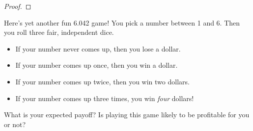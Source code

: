 \documentclass[12pt]{article}
\begin{document}
{\begin{proof}
\end{proof}

\iffalse

\begin{proof} %
\begin{align*}
\ex{R}
  & = \sum_{w \in S} R(w) \cdot \pr{w} & \text{def. of expectation}\\
  & = \sum_{w \in S} R(w) \cdot \paren{\sum_{k=1}^n \pr{w \mid E_k}
  \cdot \pr{E_k}} & \text{Total Probability} \\ & = \sum_{w \in S}
  \sum_{k=1}^n R(w) \cdot \pr{w \mid E_k} \cdot \pr{E_k} & \text{pull
  $R(w)$ into inner sum} \\ & = \sum_{k=1}^n \sum_{w \in S} R(w) \cdot
  \pr{w \mid E_k} \cdot \pr{E_k} & \text{swap sums} \\ & =
  \sum_{k=1}^n \pr{E_k} \cdot \paren{\sum_{w \in S} R(w) \cdot \pr{w
  \mid E_k}} & \text{pull $\pr{E_k}$ out} \\ & = \sum_{k=1}^n \pr{E_k}
  \cdot \ex{R \mid E_k} & \text{def. of cond. expectation}
\end{align*}
\end{proof}
\fi


\newpage
}


\begin{problem}{}
Here's yet another fun 6.042 game!  You pick a number between 1 and 6.
Then you roll three fair, independent dice.
%
\begin{itemize}
\item If your number never comes up, then you lose a dollar.
\item If your number comes up once, then you win a dollar.
\item If your number comes up twice, then you win two dollars.
\item If your number comes up three times, you win \textit{four} dollars!
\end{itemize}
%
What is your expected payoff?  Is playing this game likely to be
profitable for you or not?

\end{problem}
\end{document}
